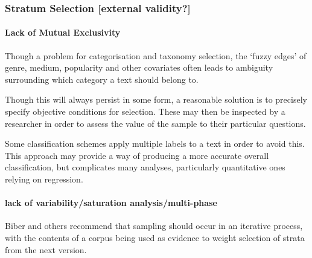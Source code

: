 \sepline


\subsubsection{Stratum Selection [external validity?]}



\paragraph{Lack of Mutual Exclusivity}
Though a problem for categorisation and taxonomy selection, the `fuzzy edges' of genre, medium, popularity and other covariates often leads to ambiguity surrounding which category a text should belong to.

Though this will always persist in some form, a reasonable solution is to precisely specify objective conditions for selection. These may then be inspected by a researcher in order to assess the value of the sample to their particular questions.

Some classification schemes apply multiple labels to a text in order to avoid this.  This approach may provide a way of producing a more accurate overall classification, but complicates many analyses, particularly quantitative ones relying on regression.


\paragraph{ lack of variability/saturation analysis/multi-phase}
Biber and others\cite{leech2006new,biber1993representativeness} recommend that sampling should occur in an iterative process, with the contents of a corpus being used as evidence to weight selection of strata from the next version.

